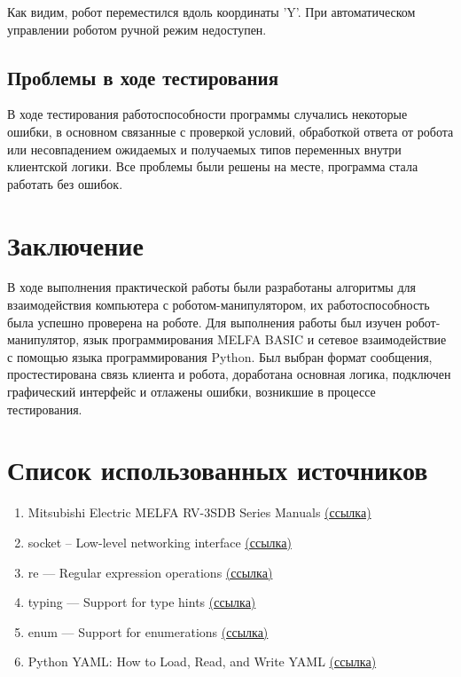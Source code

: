 \documentclass[a4paper,14pt]{extarticle}
\begin{document}
Как видим, робот переместился вдоль координаты 'Y'. При автоматическом
управлении роботом ручной режим недоступен.


\subsection{Проблемы в ходе тестирования}
В ходе тестирования работоспособности программы
случались некоторые ошибки, в основном связанные
с проверкой условий, обработкой ответа от робота
или несовпадением ожидаемых и получаемых типов переменных
внутри клиентской логики.
Все проблемы были решены на месте, программа стала работать без ошибок.


\section{Заключение}
В ходе выполнения практической работы
были разработаны алгоритмы для взаимодействия
компьютера с роботом-манипулятором,
их работоспособность была успешно проверена на роботе.
Для выполнения работы был изучен робот-манипулятор,
язык программирования MELFA BASIC
и сетевое взаимодействие с помощью
языка программирования Python.
Был выбран формат сообщения,
простестирована связь клиента и робота,
доработана основная логика, подключен
графический интерфейс и отлажены ошибки,
возникшие в процессе тестирования.


\section{Список использованных источников}
\begin{enumerate}
    \item Mitsubishi Electric MELFA RV-3SDB Series Manuals \href{https://www.manualslib.com/products/Mitsubishi-Electric-Melfa-Rv-3sdb-Series-11307307.html}{(ссылка)}
    \item socket -- Low-level networking interface \href{https://docs.python.org/3/library/socket.html}{(ссылка)}
    \item re — Regular expression operations \href{https://docs.python.org/3/library/re.html}{(ссылка)}
    \item typing — Support for type hints \href{https://docs.python.org/3/library/typing.html}{(ссылка)}
    \item enum — Support for enumerations \href{https://docs.python.org/3/library/enum.html}{(ссылка)}
    \item Python YAML: How to Load, Read, and Write YAML \href{https://python.land/data-processing/python-yaml}{(ссылка)}
\end{enumerate}
\end{document}
